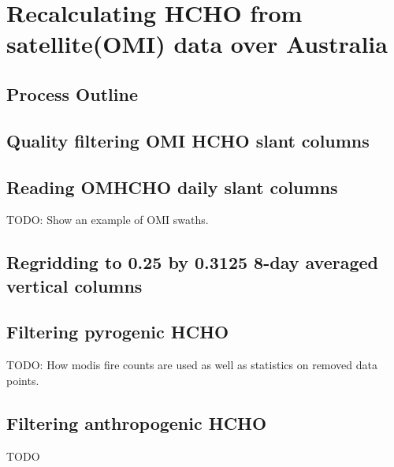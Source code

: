 \section{Recalculating HCHO from satellite(OMI) data over Australia}
\label{ch_HCHO:sec:creatinginventory}

  \subsection{Process Outline}
    
    
    
    
    
    

  \subsection{Quality filtering OMI HCHO slant columns}
    \label{ch_HCHO:sec:OMIFiltering}
    
    
  
    
  \subsection{Reading OMHCHO daily slant columns}
    
    
    TODO: Show an example of OMI swaths.
    
  \subsection{Regridding to 0.25 by 0.3125 8-day averaged vertical columns}
    

  \subsection{Filtering pyrogenic HCHO}
  \label{ch_HCHO:sec:filteringfires}
    TODO: How modis fire counts are used as well as statistics on removed data points.
    
    
    
  \subsection{Filtering anthropogenic HCHO}
    TODO
  
